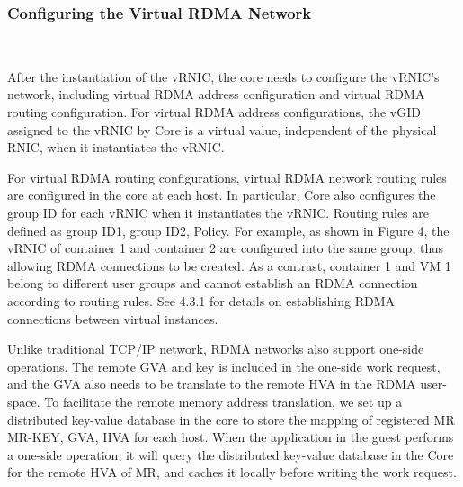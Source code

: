 \subsubsection{\textbf{Configuring the Virtual RDMA Network}}
\
\noindent

After the instantiation of the vRNIC, the \sys core needs to configure the vRNIC's network, including virtual RDMA address configuration and virtual RDMA routing configuration.
For virtual RDMA address configurations, the vGID assigned to the vRNIC by \sys Core is a virtual value, independent of the physical RNIC, when it instantiates the vRNIC.


For virtual RDMA routing configurations, virtual RDMA network routing rules are configured in the \sys core at each host. In particular, \sys Core also configures the group ID for each vRNIC when it instantiates the vRNIC. Routing rules are defined as {group ID1, group ID2, Policy}. For example, as shown in Figure 4, the vRNIC of container 1 and container 2 are configured into the same group, thus allowing RDMA connections to be created. As a contrast, container 1 and VM 1 belong to different user groups and cannot establish an RDMA connection according to routing rules. See 4.3.1 for details on establishing RDMA connections between virtual instances.


Unlike traditional TCP/IP network, RDMA networks also support one-side operations. The remote GVA and key is included in the one-side work request, and the GVA also needs to be translate to the remote HVA in the RDMA user-space. To facilitate the remote memory address translation, we set up a distributed key-value database in the \sys core to store the mapping of registered MR {MR-KEY, GVA, HVA} for each host. When the application in the guest performs a one-side operation, it will query the distributed key-value database in the \sys Core for the remote HVA of MR, and caches it locally before writing the work request.

